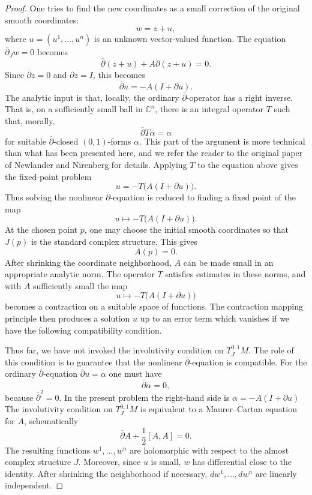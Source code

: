 \documentclass[12pt]{article}
\begin{document}
\begin{proof}
    One tries to find the new coordinates as a small correction of the original
    smooth coordinates:
    \[
        w=z+u,
    \]
    where $u=(u^1,\ldots,u^n)$
    is an unknown vector-valued function. The equation $\overline\partial_J w=0$
    becomes
    \[
        \overline\partial(z+u)+A\partial(z+u)=0.
    \]
    Since $\overline\partial z=0$ and $\partial z=I$, this becomes
    \[
        \overline\partial u = -A(I+\partial u).
    \]
    The analytic input is that, locally, the ordinary $\overline\partial$-operator
    has a right inverse. That is, on a sufficiently small ball in $\mathbb C^n$,
    there is an integral operator $T$ such that, morally,
    \[
        \overline\partial T\alpha = \alpha
    \]
    for suitable $\overline\partial$-closed $(0,1)$-forms $\alpha$. This part of the argument is more technical than what has been presented here, and we refer the reader to the original paper of Newlander and Nirenberg for details.
    Applying $T$ to the equation above gives the fixed-point problem
    \[
        u = -T\bigl(A(I+\partial u)\bigr).
    \]
    Thus solving the nonlinear $\overline\partial$-equation is reduced to finding a
    fixed point of the map
    \[
        u \longmapsto -T\bigl(A(I+\partial u)\bigr).
    \]
    At the chosen point $p$, one may choose the initial smooth coordinates so that
    $J(p)$ is the standard complex structure. This gives
    \[
        A(p)=0.
    \]
    After shrinking the coordinate neighborhood, $A$ can be made small in an
    appropriate analytic norm. The operator $T$ satisfies estimates in these norms,
    and with $A$ sufficiently small the map
    \[
        u \longmapsto -T\bigl(A(I+\partial u)\bigr)
    \]
    becomes a contraction on a suitable space of functions. The contraction mapping
    principle then produces a solution $u$ up to an error term which vanishes if we have the following compatibility condition.

    Thus far, we have not invoked the involutivity condition on $T^{0,1}_J M$. The role of this condition is to guarantee that the nonlinear
    $\overline\partial$-equation is compatible. For the ordinary
    $\overline\partial$-equation $\overline\partial u=\alpha$
    one must have
    \[
        \overline\partial\alpha=0,
    \]
    because $\overline\partial^2=0$. In the present problem the right-hand side is $\alpha=-A(I+\partial u)$
    The involutivity condition on $T^{0,1}_J M$ is equivalent to a Maurer--Cartan
    equation for $A$, schematically
    \[
        \overline\partial A + \frac12[A,A]=0.
    \]
    The resulting functions $w^1,\ldots,w^n$ are holomorphic with respect to the almost complex structure $J$. Moreover, since $u$ is small, $w$ has differential close to the identity. After shrinking the neighborhood if necessary, $dw^1,\ldots,dw^n$ are linearly independent.
\end{proof}
\end{document}
